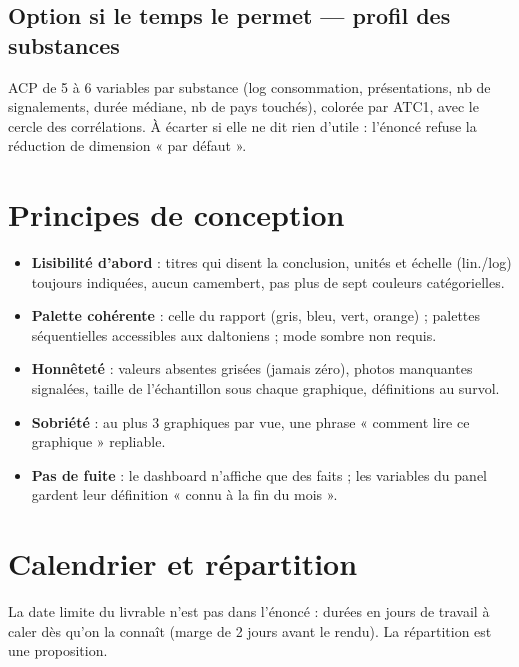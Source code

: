 \documentclass[10.5pt, a4paper]{article}
\begin{document}
\subsection*{Option si le temps le permet --- profil des substances}
ACP de 5 à 6 variables par substance (log consommation, présentations, nb de signalements, durée médiane, nb de pays touchés), colorée par ATC1, avec le cercle des
corrélations. À écarter si elle ne dit rien d'utile : l'énoncé refuse la réduction de dimension « par défaut ».

\section{Principes de conception}

\begin{itemize}
\item \textbf{Lisibilité d'abord} : titres qui disent la conclusion, unités et échelle (lin./log) toujours indiquées, aucun camembert, pas plus de sept couleurs catégorielles.
\item \textbf{Palette cohérente} : celle du rapport (gris, bleu, vert, orange) ; palettes séquentielles accessibles aux daltoniens ; mode sombre non requis.
\item \textbf{Honnêteté} : valeurs absentes grisées (jamais zéro), photos manquantes signalées, taille de l'échantillon sous chaque graphique, définitions au survol.
\item \textbf{Sobriété} : au plus 3 graphiques par vue, une phrase « comment lire ce graphique » repliable.
\item \textbf{Pas de fuite} : le dashboard n'affiche que des faits ; les variables du panel gardent leur définition « connu à la fin du mois ».
\end{itemize}

\section{Calendrier et répartition}

La date limite du livrable n'est pas dans l'énoncé : durées en jours de travail à caler dès qu'on la connaît (marge de 2 jours
avant le rendu). La répartition est une proposition.
\end{document}

